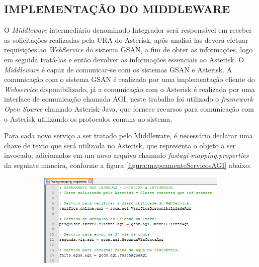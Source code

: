 \subsection{\textbf{\uppercase{Implementação do Middleware}}}

O \textit{Middleware} intermediário denominado Integrador será responsável em receber as solicitações realizadas pela URA do Asterisk, após analisá-las deverá efetuar requisições ao \textit{WebService} do sistema GSAN, a fim de obter as informações, logo em seguida tratá-las e então devolver as informações essenciais ao Asterisk.
O \textit{Middleware} é capaz de comunicar-se com os sistemas GSAN e Asterisk. A comunicação com o sistema GSAN é realizada por uma implementação cliente do \textit{Webservice} disponibilizado, já a comunicação com o Asterisk é realizada por uma interface de comunicação chamada AGI, neste trabalho foi utilizado o \textit{framework} \textit{Open Source} chamado Asterisk-Java, que fornece recursos para comunicação com o Asterisk utilizando os protocolos comuns ao sistema.

Para cada novo serviço a ser tratado pelo Middleware, é necessário declarar uma chave de texto que será utilizada no Asterisk, que representa o objeto a ser invocado, adicionados em um novo arquivo chamado \textit{fastagi-mapping.properties} da seguinte maneira, conforme a figura \ref{figura:mapeamenteServicosAGI} abaixo:

\begin{figure}[H]
	\centering
	\caption{\textbf{Mapeamento dos serviços para consumo via AGI}}
	\label{figura:mapeamenteServicosAGI}
	\begin{subfigure}[H]{\textwidth}
		\centering
		\includegraphics{figuras/mapeamento_servicos_agi.png}
	\end{subfigure}
\end{figure}



